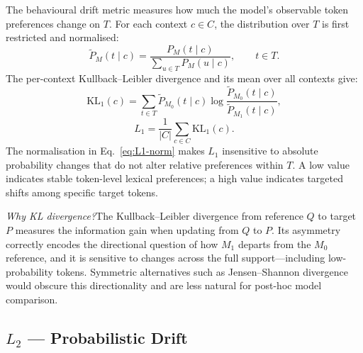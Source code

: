 \documentclass[11pt,a4paper]{article}
\newcommand{\M}[1]{M_{#1}}           %
\begin{document}
The behavioural drift metric measures how much the model's observable token preferences
change on $T$. For each context $c \in C$, the distribution over $T$ is first restricted
and normalised:
\begin{equation}
  \tilde{P}_M(t \mid c) = \frac{P_M(t \mid c)}{\displaystyle\sum_{u \in T} P_M(u \mid c)},
  \qquad t \in T.
  \label{eq:L1-norm}
\end{equation}
The per-context Kullback--Leibler divergence and its mean over all contexts give:
\[
  \mathrm{KL}_1(c) = \sum_{t \in T} \tilde{P}_{M_0}(t \mid c)
    \log\frac{\tilde{P}_{M_0}(t \mid c)}{\tilde{P}_{M_1}(t \mid c)},
\]
\begin{equation}
  L_1 = \frac{1}{|C|} \sum_{c \in C} \mathrm{KL}_1(c).
  \label{eq:L1}
\end{equation}
The normalisation in Eq.~\eqref{eq:L1-norm} makes $L_1$ insensitive to absolute
probability changes that do not alter relative preferences within $T$. A low value
indicates stable token-level lexical preferences; a high value indicates targeted shifts
among specific target tokens.

\medskip
\noindent\textit{Why KL divergence?}\enspace The Kullback--Leibler divergence from
reference $Q$ to target $P$ measures the information gain when updating from $Q$ to $P$.
Its asymmetry correctly encodes the directional question of how $\M{1}$ departs from the
$\M{0}$ reference, and it is sensitive to changes across the full support---including
low-probability tokens. Symmetric alternatives such as Jensen--Shannon divergence would
obscure this directionality and are less natural for post-hoc model comparison.

\subsection{\texorpdfstring{$L_2$}{L2} --- Probabilistic Drift}
\end{document}
